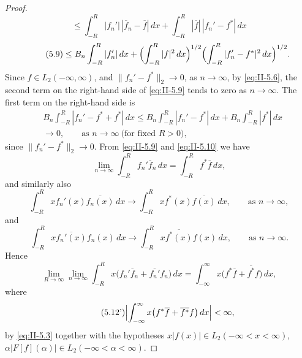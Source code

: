 \begin{proof}
\[\le\int_{-R}^{R}|f_{n}'|\,|\overline{f}_{n}-\overline{f}|\,dx
+\int_{-R}^{R}|\overline{f}|\,|f_{n}'-f^{*}|\,dx
\]
\begin{equation}\tag{5.9}\label{eq:II-5.9}
\le B_{n}\int_{-R}^{R}|f_{n}'|\,dx
+\Bigl(\int_{-R}^{R}|f|^{2}\,dx\Bigr)^{1/2}
\Bigl(\int_{-R}^{R}|f_{n}'-f^{*}|^{2}\,dx\Bigr)^{1/2}.
\end{equation}
Since $f\in L_{2}(-\infty,\infty)$, and $\|f_{n}'-f^{*}\|_{2}\to 0$, as $n\to\infty$, by \eqref{eq:II-5.6}, the second term on the right-hand side of \eqref{eq:II-5.9} tends to zero as $n\to\infty$. The first term on the right-hand side is
\begin{equation}\tag{5.10}\label{eq:II-5.10}
\begin{aligned}
&B_{n}\int_{-R}^{R}|f_{n}'-f^{*}+f^{*}|\,dx
\le B_{n}\int_{-R}^{R}|f_{n}'-f^{*}|\,dx+B_{n}\int_{-R}^{R}|f^{*}|\,dx\\
&\to 0,\qquad\text{as }n\to\infty\ \text{(for fixed }R>0),
\end{aligned}
\end{equation}
since $\|f_{n}'-f^{*}\|_{2}\to 0$. From \eqref{eq:II-5.9} and \eqref{eq:II-5.10} we have
\begin{equation}\tag{5.11}\label{eq:II-5.11}
\lim_{n\to\infty}\int_{-R}^{R}f_{n}'\overline{f}_{n}\,dx
=\int_{-R}^{R}f^{*}\overline{f}\,dx,
\end{equation}
and similarly also
\[
\int_{-R}^{R}x f_{n}'(x)\overline{f_{n}(x)}\,dx\to\int_{-R}^{R}x f^{*}(x)\overline{f(x)}\,dx,\qquad\text{as }n\to\infty,
\]
and
\[
\int_{-R}^{R}x\overline{f_{n}'(x)}f_{n}(x)\,dx\to\int_{-R}^{R}x\overline{f^{*}(x)}f(x)\,dx,\qquad\text{as }n\to\infty.
\]
Hence
\begin{equation}\tag{5.12}\label{eq:II-5.12}
\lim_{R\to\infty}\lim_{n\to\infty}\int_{-R}^{R}x\bigl(f_{n}'\overline{f}_{n}+\overline{f_{n}'}f_{n}\bigr)\,dx
=\int_{-\infty}^{\infty}x\bigl(f^{*}\overline{f}+\overline{f^{*}}f\bigr)\,dx,
\end{equation}
where
\begin{equation}\tag{5.12'}\label{eq:II-5.12p}
\Bigl|\int_{-\infty}^{\infty}x\bigl(f^{*}\overline{f}+\overline{f^{*}}f\bigr)\,dx\Bigr|<\infty,
\end{equation}
by \eqref{eq:II-5.3} together with the hypotheses $x|f(x)|\in L_{2}(-\infty<x<\infty)$, $\alpha|F[f](\alpha)|\in L_{2}(-\infty<\alpha<\infty)$.


\end{proof}
